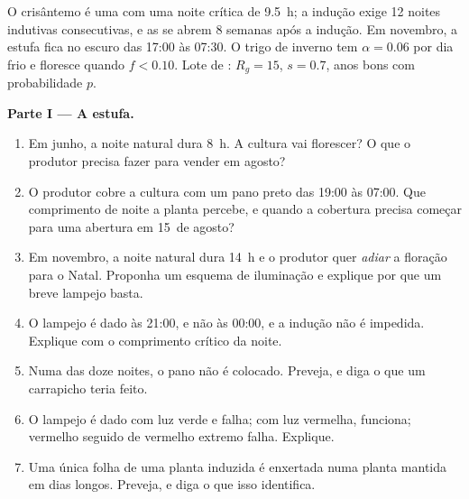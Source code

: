 \begin{problem}
\label{pb:b2:plant-flowering:1}
O crisântemo é uma  com uma noite crítica de
\qty{9.5}{h}; a indução exige \num{12} noites indutivas consecutivas, e
as  se abrem \num{8} semanas após a indução. Em novembro, a
estufa fica no escuro das 17:00 às 07:30. O trigo de inverno tem
$\alpha = 0.06$ por dia frio e floresce quando $f < 0.10$. Lote de
: $R_g = 15$, $s = 0.7$, anos bons com probabilidade $p$.

\medskip
\noindent\textbf{Parte I --- A estufa.}
\begin{enumerate}
  \item Em junho, a noite natural dura \qty{8}{h}. A cultura vai
        florescer? O que o produtor precisa fazer para vender  em
        agosto?
  \item O produtor cobre a cultura com um pano preto das 19:00 às
        07:00. Que comprimento de noite a planta percebe, e quando a
        cobertura precisa começar para uma abertura em 15~de agosto?
  \item Em novembro, a noite natural dura \qty{14}{h} e o produtor quer
        \emph{adiar} a floração para o Natal. Proponha um esquema de
        iluminação e explique por que um breve lampejo basta.
  \item O lampejo é dado às 21:00, e não às 00:00, e a indução não é
        impedida. Explique com o comprimento crítico da noite.
  \item Numa das doze noites, o pano não é colocado. Preveja, e diga o
        que um carrapicho teria feito.
  \item O lampejo é dado com luz verde e falha; com luz vermelha,
        funciona; vermelho seguido de vermelho extremo falha. Explique.
  \item Uma única folha de uma planta induzida é enxertada numa planta
        mantida em dias longos. Preveja, e diga o que isso identifica.
\end{enumerate}


\end{problem}
